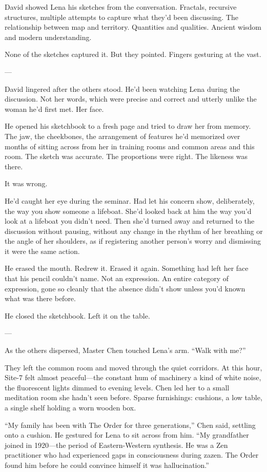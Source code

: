 David showed Lena his sketches from the conversation. Fractals, recursive structures, multiple attempts to capture what they'd been discussing. The relationship between map and territory. Quantities and qualities. Ancient wisdom and modern understanding.

None of the sketches captured it. But they pointed. Fingers gesturing at the vast.

---

David lingered after the others stood. He'd been watching Lena during the discussion. Not her words, which were precise and correct and utterly unlike the woman he'd first met. Her face.

He opened his sketchbook to a fresh page and tried to draw her from memory. The jaw, the cheekbones, the arrangement of features he'd memorized over months of sitting across from her in training rooms and common areas and this room. The sketch was accurate. The proportions were right. The likeness was there.

It was wrong.

He'd caught her eye during the seminar. Had let his concern show, deliberately, the way you show someone a lifeboat. She'd looked back at him the way you'd look at a lifeboat you didn't need. Then she'd turned away and returned to the discussion without pausing, without any change in the rhythm of her breathing or the angle of her shoulders, as if registering another person's worry and dismissing it were the same action.

He erased the mouth. Redrew it. Erased it again. Something had left her face that his pencil couldn't name. Not an expression. An entire category of expression, gone so cleanly that the absence didn't show unless you'd known what was there before.

He closed the sketchbook. Left it on the table.

---

As the others dispersed, Master Chen touched Lena's arm. ``Walk with me?''

They left the common room and moved through the quiet corridors. At this hour, Site-7 felt almost peaceful—the constant hum of machinery a kind of white noise, the fluorescent lights dimmed to evening levels. Chen led her to a small meditation room she hadn't seen before. Sparse furnishings: cushions, a low table, a single shelf holding a worn wooden box.

``My family has been with The Order for three generations,'' Chen said, settling onto a cushion. He gestured for Lena to sit across from him. ``My grandfather joined in 1920—the period of Eastern-Western synthesis. He was a Zen practitioner who had experienced gaps in consciousness during zazen. The Order found him before he could convince himself it was hallucination.''

